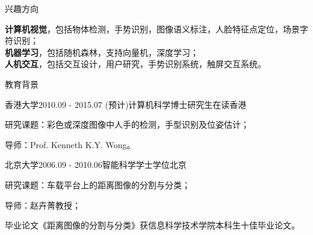 \documentclass{cv_professional-cn} %
\begin{document}

\begin{rSection}{兴趣方向}

{\bf 计算机视觉}，包括物体检测，手势识别，图像语义标注，人脸特征点定位，场景字符识别；\\ 
{\bf 机器学习}，包括随机森林，支持向量机，深度学习； \\ 
{\bf 人机交互}，包括交互设计，用户研究，手势识别系统，触屏交互系统。

\end{rSection}


\begin{rSection}{教育背景}

\begin{rSubsection}{香港大学}{2010.09 - 2015.07 (预计)}{计算机科学博士研究生在读}{香港}\\ 
	\item 研究课题：彩色或深度图像中人手的检测，手型识别及位姿估计；
	\item 导师：Prof. Kenneth K.Y. Wong。
\end{rSubsection}

\begin{rSubsection}{北京大学}{2006.09 - 2010.06}{智能科学学士学位}{北京} 
	\item 研究课题：车载平台上的距离图像的分割与分类；
	\item 导师：赵卉菁教授；
	\item 毕业论文《距离图像的分割与分类》获信息科学技术学院本科生十佳毕业论文。
\end{rSubsection}
\end{rSection}

\end{document}
